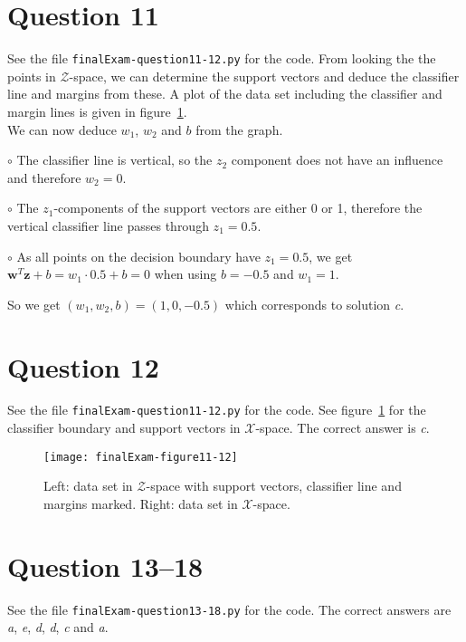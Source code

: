 \documentclass[	11pt,
				a4paper,
				twoside,
				titlepage,
				bibtotoc,
				openright,
				cleardoublepage=empty
				]{scrartcl}
\newcommand{\cir}{$\circ$}
\begin{document}
\section{Question 11} %
See the file \verb|finalExam-question11-12.py| for the code.
From looking the the points in $\mathcal{Z}$-space, we can determine the support vectors and deduce the classifier line and margins from these. A plot of the data set including the classifier and margin lines is given in figure~\ref{fig:question11}.\\
We can now deduce $w_1$, $w_2$ and $b$ from the graph.
\begin{ronum}
	\item[\cir] The classifier line is vertical, so the $z_2$ component does not have an influence and therefore $w_2 = 0$.
	\item[\cir] The $z_1$-components of the support vectors are either 0 or 1, therefore the vertical classifier line passes through $z_1 = 0.5$.
	\item[\cir] As all points on the decision boundary have $z_1 = 0.5$, we get $\mathbf{w}^T\mathbf{z} + b = w_1\cdot0.5 + b = 0$ when using $b = -0.5$ and $w_1 = 1$.
\end{ronum}
 So we get $(w_1, w_2, b) = (1, 0, -0.5)$ which corresponds to solution \emph{c}.
 
 \section{Question 12} %
 See the file \verb|finalExam-question11-12.py| for the code. See figure~\ref{fig:question11} for the classifier boundary and support vectors in $\mathcal{X}$-space. The correct answer is \emph{c}.
\begin{figure}[!h]
	\texttt{[image: finalExam-figure11-12]}
	\caption{Left: data set in $\mathcal{Z}$-space with support vectors, classifier line and margins marked. Right: data set in $\mathcal{X}$-space.}
	\label{fig:question11}
\end{figure}

\section{Question 13--18} %
See the file \verb|finalExam-question13-18.py| for the code. The correct answers are \emph{a}, \emph{e}, \emph{d}, \emph{d}, \emph{c} and \emph{a}.
\vspace{\baselineskip}
\end{document}
